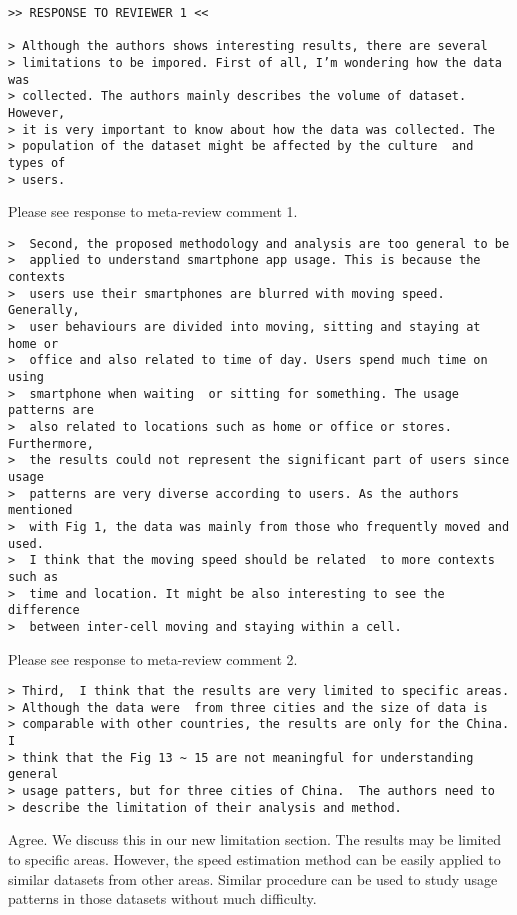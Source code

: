\newpage
\begin{verbatim}
>> RESPONSE TO REVIEWER 1 <<

> Although the authors shows interesting results, there are several
> limitations to be impored. First of all, I’m wondering how the data was
> collected. The authors mainly describes the volume of dataset. However,
> it is very important to know about how the data was collected. The
> population of the dataset might be affected by the culture  and types of
> users.
\end{verbatim}

Please see response to meta-review comment 1.

\begin{verbatim}
>  Second, the proposed methodology and analysis are too general to be
>  applied to understand smartphone app usage. This is because the contexts
>  users use their smartphones are blurred with moving speed. Generally,
>  user behaviours are divided into moving, sitting and staying at home or
>  office and also related to time of day. Users spend much time on using
>  smartphone when waiting  or sitting for something. The usage patterns are
>  also related to locations such as home or office or stores. Furthermore,
>  the results could not represent the significant part of users since usage
>  patterns are very diverse according to users. As the authors mentioned
>  with Fig 1, the data was mainly from those who frequently moved and used.
>  I think that the moving speed should be related  to more contexts such as
>  time and location. It might be also interesting to see the difference
>  between inter-cell moving and staying within a cell.
\end{verbatim}

Please see response to meta-review comment 2.

\begin{verbatim}
> Third,  I think that the results are very limited to specific areas.
> Although the data were  from three cities and the size of data is
> comparable with other countries, the results are only for the China. I
> think that the Fig 13 ~ 15 are not meaningful for understanding general
> usage patters, but for three cities of China.  The authors need to
> describe the limitation of their analysis and method.
\end{verbatim}

Agree. We discuss this in our new limitation section. The results may be limited to specific areas. However, the speed estimation method can be easily applied to similar datasets from other areas. Similar procedure can be used to study usage patterns in those datasets without much difficulty.

